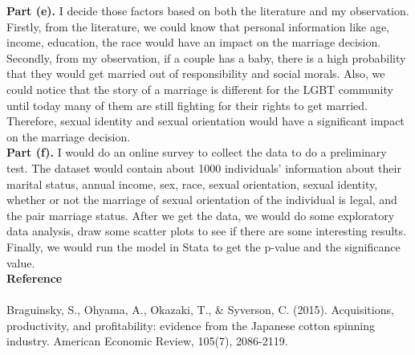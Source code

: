 \documentclass[letterpaper,12pt]{article}
\theoremstyle{definition}
\begin{document}
\textbf{Part (e).} 
I decide those factors based on both the literature and my observation. Firstly, from the literature, we could know that personal information like age, income, education, the race would have an impact on the marriage decision. Secondly, from my observation, if a couple has a baby, there is a high probability that they would get married out of responsibility and social morals. Also, we could notice that the story of a marriage is different for the LGBT community until today many of them are still fighting for their rights to get married. Therefore, sexual identity and sexual orientation would have a significant impact on the marriage decision.
\\

\textbf{Part (f).} 
I would do an online survey to collect the data to do a preliminary test. The dataset would contain about 1000 individuals' information about their marital status, annual income, sex, race, sexual orientation, sexual identity, whether or not the marriage of sexual orientation of the individual is legal, and the pair marriage status. After we get the data, we would do some exploratory data analysis, draw some scatter plots to see if there are some interesting results. Finally, we would run the model in Stata to get the p-value and the significance value.
\\

\newpage
\noindent\textbf{Reference}\\
\textbf\\
Braguinsky, S., Ohyama, A., Okazaki, T., \& Syverson, C. (2015). Acquisitions, productivity, and profitability: evidence from the Japanese cotton spinning industry. American Economic Review, 105(7), 2086-2119.
\end{document}
